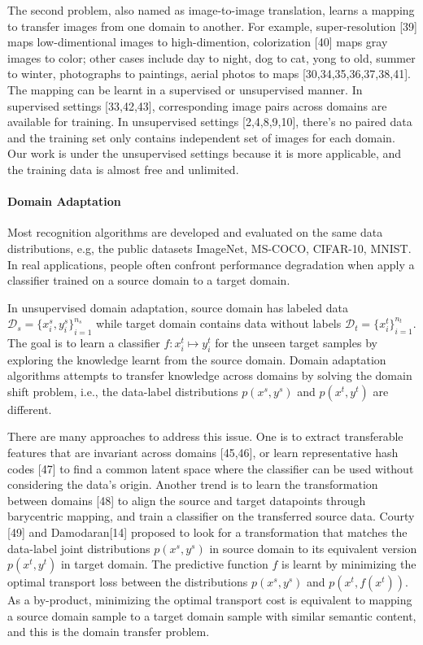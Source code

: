 \documentclass{article}
\begin{document}
The second problem, also named as image-to-image translation, learns a mapping to transfer images from one domain to another. For example, super-resolution [39] maps low-dimentional images to high-dimention, colorization [40] maps gray images to color; other cases include day to night, dog to cat, yong to old, summer to winter, photographs to paintings, aerial photos to maps [30,34,35,36,37,38,41]. The mapping can be learnt in a supervised or unsupervised manner. In supervised settings [33,42,43], corresponding image pairs across domains are available for training. In unsupervised settings [2,4,8,9,10], there's no paired data and the training set only contains independent set of images for each domain. Our work is under the unsupervised settings because it is more applicable, and the training data is almost free and unlimited.


\paragraph{Domain Adaptation}
Most recognition algorithms are developed and evaluated on the same data distributions, e.g, the public datasets ImageNet, MS-COCO, CIFAR-10, MNIST. In real applications, people often confront performance degradation when apply a classifier trained on a source domain to a target domain.

In unsupervised domain adaptation, source domain has labeled data $\mathcal{D}_s = {\{x_i^s, y_i^s\}}_{i=1}^{n_s}$ while target domain contains data without labels $\mathcal{D}_t = {\{x_i^t\}}_{i=1}^{n_t}$. The goal is to learn a classifier $f: x_i^t \mapsto y_i^t$ for the unseen target samples by exploring the knowledge learnt from the source domain. Domain adaptation algorithms attempts to transfer knowledge across domains by solving the domain shift problem, i.e., the data-label distributions $p(x^s, y^s)$ and $p(x^t, y^t)$ are different.

There are many approaches to address this issue. One is to extract transferable features that are invariant across domains [45,46], or learn representative hash codes [47] to find a common latent space where the classifier can be used without considering the data's origin. Another trend is to learn the transformation between domains [48] to align the source and target datapoints through barycentric mapping, and train a classifier on the transferred source data. Courty [49] and Damodaran[14] proposed to look for a transformation that matches the data-label joint distributions $p(x^s, y^s)$ in source domain to its equivalent version $p(x^t, y^t)$ in target domain. The predictive function $f$ is learnt by minimizing the optimal transport loss between the distributions $p(x^s, y^s)$ and $p(x^t, f(x^t))$. As a by-product, minimizing the optimal transport cost is equivalent to mapping a source domain sample to a target domain sample with similar semantic content, and this is the domain transfer problem.
\end{document}
